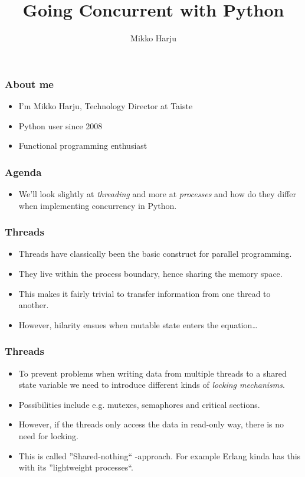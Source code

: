 \documentclass[13pt,xcolor=dvipsnames]{beamer}
\title{Going Concurrent with Python}
\author{Mikko Harju}
\institute{Taiste}
\begin{document}
\begin{frame}
\titlepage
\end{frame}

\begin{frame}
    \frametitle{About me}
    \begin{itemize}
        \item I'm Mikko Harju, Technology Director at Taiste
        \item Python user since 2008
        \item Functional programming enthusiast
    \end{itemize}
\end{frame}

\begin{frame}
    \frametitle{Agenda}
    \begin{itemize}
        \item We'll look slightly at \emph{threading} and more at \emph{processes} and how do they differ when
            implementing concurrency in Python.
    \end{itemize}
\end{frame}

\begin{frame}
    \frametitle{Threads}
    \begin{itemize}
        \item Threads have classically been the basic construct for parallel programming.
        \item They live within the process boundary, hence sharing the memory space.
        \item This makes it fairly trivial to transfer information from one thread to another.
        \item However, hilarity ensues when mutable state enters the equation\ldots
    \end{itemize}
\end{frame}

\begin{frame}
    \frametitle{Threads}
    \begin{itemize}
        \item To prevent problems when writing data from multiple threads to a shared state variable we need to
            introduce different kinds of \emph{locking mechanisms}.
        \item Possibilities include e.g. mutexes, semaphores and critical sections.
        \item However, if the threads only access the data in read-only way, there is no need for locking.
        \item This is called ''Shared-nothing`` -approach. For example Erlang kinda has this with its ''lightweight
            processes``.
    \end{itemize}
\end{frame}
\end{document}
